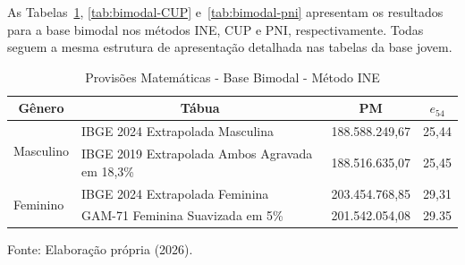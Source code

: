As Tabelas~\ref{tab:bimodal-ine}, \ref{tab:bimodal-CUP} e~\ref{tab:bimodal-pni} apresentam os resultados para a base bimodal nos métodos INE, CUP e PNI, respectivamente. Todas seguem a mesma estrutura de apresentação detalhada nas tabelas da base jovem.
\vspace{0.25cm}
\begin{table}[htbp]
    \centering
    \caption{Provisões Matemáticas - Base Bimodal - Método INE}
    \begin{threeparttable}
    \renewcommand{\arraystretch}{1.0}
    \begin{tabular}{llrr}
    \toprule
    \multicolumn{1}{c}{\textbf{Gênero}} & \multicolumn{1}{c}{\textbf{Tábua}} & \multicolumn{1}{c}{\textbf{PM}} & \multicolumn{1}{c}{\textbf{$e_{54}$}} \\ \midrule
    \multirow{2}{*}{Masculino} & IBGE 2024 Extrapolada Masculina & 188.588.249,67 & 25,44 \\
                                & IBGE 2019 Extrapolada Ambos Agravada em 18,3\% & 188.516.635,07 & 25,45 \\ \hline
    \multirow{2}{*}{Feminino} & IBGE 2024 Extrapolada Feminina & 203.454.768,85 & 29,31 \\
                                & GAM-71 Feminina Suavizada em 5\% & 201.542.054,08 & 29.35 \\ \bottomrule
    \end{tabular}
    \begin{tablenotes}[flushleft]
        \small
        \item Fonte: Elaboração própria (2026).
    \end{tablenotes}
    \end{threeparttable}
    \label{tab:bimodal-ine}
\end{table}
\vspace{0.5cm}

